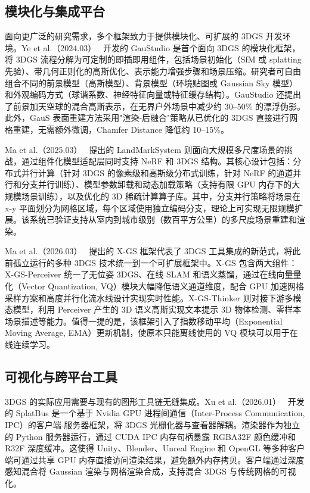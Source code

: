 \subsection{模块化与集成平台}

面向更广泛的研究需求，多个框架致力于提供模块化、可扩展的 3DGS 开发环境。Ye et al.（2024.03）~\cite{2403_19632} 开发的 GauStudio 是首个面向 3DGS 的模块化框架，将 3DGS 流程分解为可定制的即插即用组件，包括场景初始化（SfM 或 splatting 先验）、带几何正则化的高斯优化、表示能力增强步骤和场景压缩。研究者可自由组合不同的前景模型（高斯模型）、背景模型（环境贴图或 Gaussian Sky 模型）和外观编码方式（球谐系数、神经特征向量或特征缓存结构）。GauStudio 还提出了前景加天空球的混合高斯表示，在无界户外场景中减少约 30--50\% 的漂浮伪影。此外，GauS 表面重建方法采用"渲染-后融合"策略从已优化的 3DGS 直接进行网格重建，无需额外微调，Chamfer Distance 降低约 10--15\%。

Ma et al.（2025.03）~\cite{2503_21364} 提出的 LandMarkSystem 则面向大规模多尺度场景的挑战，通过组件化模型适配层同时支持 NeRF 和 3DGS 结构。其核心设计包括：分布式并行计算（针对 3DGS 的像素级和高斯级分布式训练，针对 NeRF 的通道并行和分支并行训练）、模型参数卸载和动态加载策略（支持有限 GPU 内存下的大规模场景训练），以及优化的 3D 稀疏计算算子库。其中，分支并行策略将场景在 x-y 平面划分为网格区域，每个区域使用独立编码分支，理论上可实现无限规模扩展。该系统已验证支持从室内到城市级别（数百平方公里）的多尺度场景重建和渲染。

Ma et al.（2026.03）~\cite{2603_09632} 提出的 X-GS 框架代表了 3DGS 工具集成的新范式，将此前孤立运行的多种 3DGS 技术统一到一个可扩展框架中。X-GS 包含两大组件：X-GS-Perceiver 统一了无位姿 3DGS、在线 SLAM 和语义蒸馏，通过在线向量量化（Vector Quantization, VQ）模块大幅降低语义通道维度，配合 GPU 加速网格采样方案和高度并行化流水线设计实现实时性能。X-GS-Thinker 则对接下游多模态模型，利用 Perceiver 产生的 3D 语义高斯实现文本提示 3D 物体检测、零样本场景描述等能力。值得一提的是，该框架引入了指数移动平均（Exponential Moving Average, EMA）更新机制，使原本只能离线使用的 VQ 模块可以用于在线连续学习。

\subsection{可视化与跨平台工具}

3DGS 的实际应用需要与现有的图形工具链无缝集成。Xu et al.（2026.01）~\cite{2601_15431} 开发的 SplatBus 是一个基于 Nvidia GPU 进程间通信（Inter-Process Communication, IPC）的客户端-服务器框架，将 3DGS 光栅化器与查看器解耦。渲染器作为独立的 Python 服务器运行，通过 CUDA IPC 内存句柄暴露 RGBA32F 颜色缓冲和 R32F 深度缓冲。这使得 Unity、Blender、Unreal Engine 和 OpenGL 等多种客户端可通过共享 GPU 内存直接访问渲染结果，避免额外内存拷贝。客户端通过深度感知混合将 Gaussian 渲染与网格渲染合成，支持混合 3DGS 与传统网格的可视化。

